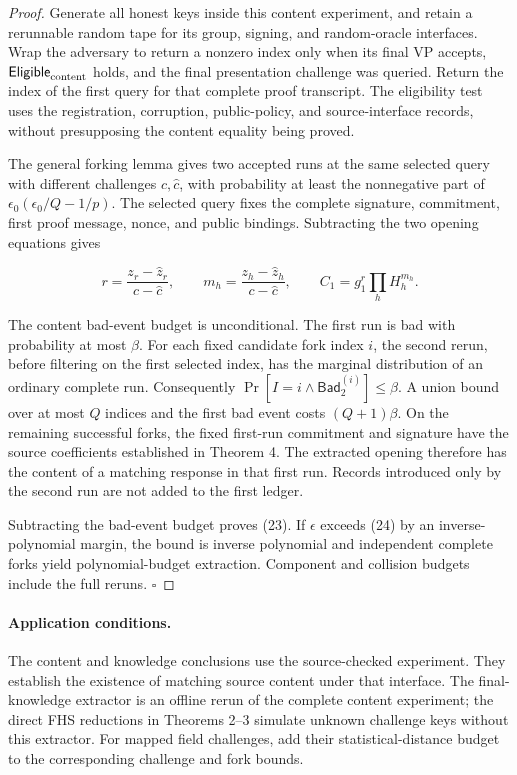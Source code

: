 \documentclass[11pt]{article}
\begin{document}
\begin{proof}
Generate all honest keys inside this content experiment, and retain a rerunnable random tape for its group, signing, and random-oracle interfaces. Wrap the adversary to return a nonzero index only when its final VP accepts, \(\mathsf{Eligible}_{\rm content}\) holds, and the final presentation challenge was queried. Return the index of the first query for that complete proof transcript. The eligibility test uses the registration, corruption, public-policy, and source-interface records, without presupposing the content equality being proved.

The general forking lemma \cite{BellareNeven2006} gives two accepted runs at the same selected query with different challenges \(c,\widehat c\), with probability at least the nonnegative part of \(\epsilon_0(\epsilon_0/Q-1/p)\). The selected query fixes the complete signature, commitment, first proof message, nonce, and public bindings. Subtracting the two opening equations gives

\[
r=\frac{z_r-\widehat z_r}{c-\widehat c},\qquad
m_h=\frac{z_h-\widehat z_h}{c-\widehat c},
\qquad C_1=g_1^r\prod_hH_h^{m_h}.
\tag{25}
\]

The content bad-event budget is unconditional. The first run is bad with probability at most \(\beta\). For each fixed candidate fork index \(i\), the second rerun, before filtering on the first selected index, has the marginal distribution of an ordinary complete run. Consequently \(\Pr[I=i\land\mathsf{Bad}_2^{(i)}]\le\beta\). A union bound over at most \(Q\) indices and the first bad event costs \((Q+1)\beta\). On the remaining successful forks, the fixed first-run commitment and signature have the source coefficients established in Theorem 4. The extracted opening therefore has the content of a matching response in that first run. Records introduced only by the second run are not added to the first ledger.

Subtracting the bad-event budget proves (23). If \(\epsilon\) exceeds (24) by an inverse-polynomial margin, the bound is inverse polynomial and independent complete forks yield polynomial-budget extraction. Component and collision budgets include the full reruns. \(\square\)

\end{proof}
\paragraph{Application conditions.}
The content and knowledge conclusions use the source-checked experiment. They establish the existence of matching source content under that interface. The final-knowledge extractor is an offline rerun of the complete content experiment; the direct FHS reductions in Theorems 2–3 simulate unknown challenge keys without this extractor. For mapped field challenges, add their statistical-distance budget to the corresponding challenge and fork bounds.
\end{document}
